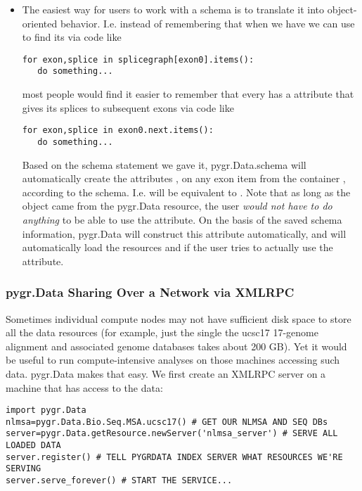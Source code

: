 \documentclass{howto}
\begin{document}
\begin{itemize}
\item The easiest way for users to work with a schema is to translate
it into object-oriented behavior.  I.e. instead of remembering that
when we have  we can use  to find its
 via code like 
\begin{verbatim}
for exon,splice in splicegraph[exon0].items():
   do something...
\end{verbatim}
most people would find it easier to remember that every 
has a  attribute that gives its splices to subsequent exons
via code like
\begin{verbatim}
for exon,splice in exon0.next.items():
   do something...
\end{verbatim}
Based on the schema statement we gave it,
pygr.Data.schema will automatically create the attributes ,
 on any exon item from the container ,
according to the schema.  I.e.  will be equivalent to
.  Note that as long as the object 
came from the pygr.Data resource, the user {\em would not have to do anything}
to be able to use the  attribute.  On the basis of the saved
schema information, pygr.Data will construct this attribute automatically,
and will automatically load the resources  and 
if the user tries to actually use the  attribute.
\end{itemize}

\subsubsection{pygr.Data Sharing Over a Network via XMLRPC}
Sometimes individual compute nodes may not have sufficient disk space to
store all the data resources (for example, just the single the ucsc17 17-genome alignment and 
associated genome databases takes about 200 GB).  Yet it would be useful
to run compute-intensive analyses on those machines accessing such data.
pygr.Data makes that easy.  We first create an XMLRPC server on a machine that
has access to the data:

\begin{verbatim}
import pygr.Data
nlmsa=pygr.Data.Bio.Seq.MSA.ucsc17() # GET OUR NLMSA AND SEQ DBs
server=pygr.Data.getResource.newServer('nlmsa_server') # SERVE ALL LOADED DATA
server.register() # TELL PYGRDATA INDEX SERVER WHAT RESOURCES WE'RE SERVING
server.serve_forever() # START THE SERVICE...
\end{verbatim}
\end{document}
